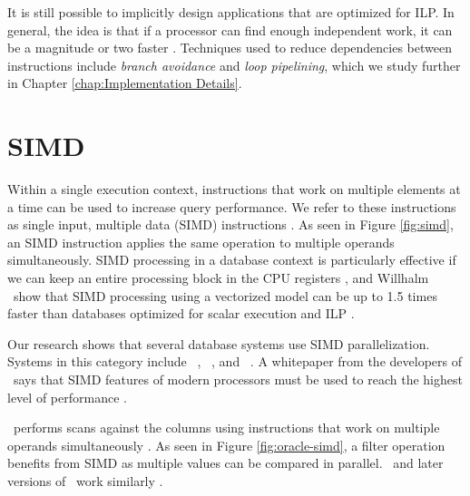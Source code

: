 It is still possible to implicitly design applications that are optimized for ILP. In general, the idea is that if a processor can find enough independent work, it can be a magnitude or two faster \cite{Boncz2005-wj}. Techniques used to reduce dependencies between instructions include \textit{branch avoidance} and \textit{loop pipelining}, which we study further in Chapter \ref{chap:Implementation Details}.

\section{SIMD}
\label{sec:SIMD}
Within a single execution context, instructions that work on multiple elements at a time can be used to increase query performance. We refer to these instructions as single input, multiple data (SIMD) instructions \cite{Wikipedia_contributors2015-ax}. As seen in Figure \ref{fig:simd}, an SIMD instruction applies the same operation to multiple operands simultaneously. SIMD processing in a database context is particularly effective if we can keep an entire processing block in the CPU registers \cite{Neumann2011-uq}, and Willhalm \ea~show that SIMD processing using a vectorized model can be up to 1.5 times faster than databases optimized for scalar execution and ILP \cite{Willhalm2009-hu}.

Our research shows that several database systems use SIMD parallelization. Systems in this category include \oracle~\cite{Lahiri2015-mz}, \blink~\cite{Barber2012-xt}, and \ibm~\cite{Raman2013-em}. A whitepaper from the developers of \exasol~says that SIMD features of modern processors must be used to reach the highest level of performance \cite{Exasol2014-xh}.

\oracle~performs scans against the columns using instructions that work on multiple operands simultaneously \cite{Lahiri2015-mz}. As seen in Figure \ref{fig:oracle-simd}, a filter operation benefits from SIMD as multiple values can be compared in parallel. \ibm~and later versions of \blink~work similarly \cite{Barber2012-xt, Raman2013-em}.


